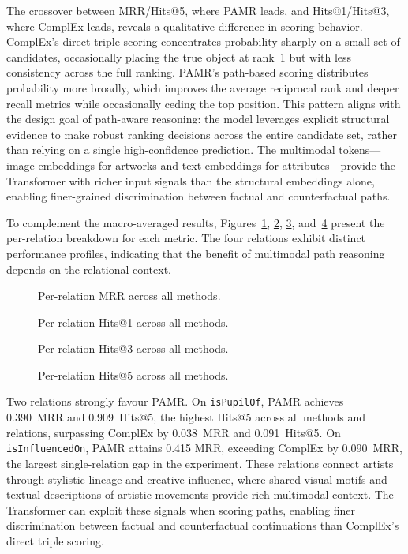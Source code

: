 \documentclass[runningheads]{llncs}
\begin{document}
The crossover between MRR/Hits@5, where PAMR leads, and Hits@1/Hits@3,
where ComplEx leads, reveals a qualitative difference in scoring
behavior. ComplEx's direct triple scoring concentrates probability
sharply on a small set of candidates, occasionally placing the true
object at rank~1 but with less consistency across the full ranking.
PAMR's path-based scoring distributes probability more broadly, which
improves the average reciprocal rank and deeper recall metrics while
occasionally ceding the top position. This pattern aligns with the
design goal of path-aware reasoning: the model leverages explicit
structural evidence to make robust ranking decisions across the entire
candidate set, rather than relying on a single high-confidence
prediction. The multimodal tokens—image embeddings for artworks and
text embeddings for attributes—provide the Transformer with richer
input signals than the structural embeddings alone, enabling
finer-grained discrimination between factual and counterfactual paths.

To complement the macro-averaged results, Figures~\ref{fig:mrr},
\ref{fig:hits1}, \ref{fig:hits3}, and~\ref{fig:hits5} present the
per-relation breakdown for each metric. The four relations exhibit
distinct performance profiles, indicating that the benefit of
multimodal path reasoning depends on the relational context.

\begin{figure}[t]
  \centering
  
  \caption{Per-relation MRR across all methods.}
  \label{fig:mrr}
\end{figure}

\begin{figure}[t]
  \centering
  
  \caption{Per-relation Hits@1 across all methods.}
  \label{fig:hits1}
\end{figure}

\begin{figure}[t]
  \centering
  
  \caption{Per-relation Hits@3 across all methods.}
  \label{fig:hits3}
\end{figure}

\begin{figure}[t]
  \centering
  
  \caption{Per-relation Hits@5 across all methods.}
  \label{fig:hits5}
\end{figure}

Two relations strongly favour PAMR. On \texttt{isPupilOf}, PAMR
achieves 0.390~MRR and 0.909~Hits@5, the highest Hits@5 across all
methods and relations, surpassing ComplEx by 0.038~MRR and
0.091~Hits@5. On \texttt{isInfluencedOn}, PAMR attains 0.415 MRR,
exceeding ComplEx by 0.090~MRR, the largest single-relation gap in
the experiment. These relations connect artists through stylistic
lineage and creative influence, where shared visual motifs and textual
descriptions of artistic movements provide rich multimodal context.
The Transformer can exploit these signals when scoring paths, enabling
finer discrimination between factual and counterfactual continuations
than ComplEx's direct triple scoring.
\end{document}

